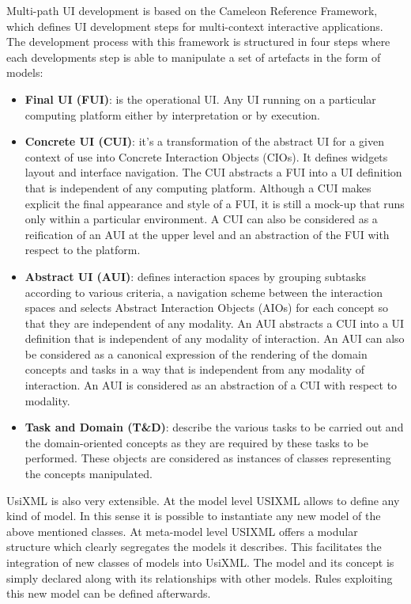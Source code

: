Multi-path UI development is based on the Cameleon Reference Framework\cite{Calvary}, which defines UI development steps for multi-context interactive applications. The development process with this framework is structured in four steps where each developments step is able to manipulate a set of artefacts in the form of models:
\begin{itemize}
\item \textbf{Final UI (FUI)}: is the operational UI. Any UI running on a particular computing platform either by interpretation or by execution.

\item \textbf{Concrete UI (CUI)}: it's a transformation of the abstract UI for a given context of use into Concrete Interaction Objects (CIOs). It defines widgets layout and interface navigation. The CUI abstracts a FUI into a UI definition that is independent of any computing platform. Although a CUI makes explicit the final appearance and style of a FUI, it is still a mock-up that runs only within a particular environment. A CUI can also be considered as a reification of an AUI at the upper level and an abstraction of the FUI with respect to the platform.

\item \textbf{Abstract UI (AUI)}: defines interaction spaces by grouping subtasks according to various criteria, a navigation scheme between the interaction spaces and selects Abstract Interaction Objects (AIOs) for each concept so that they are independent of any modality. An AUI abstracts a CUI into a UI definition that is independent of any modality of interaction. An AUI can also be considered as a canonical expression of the rendering of the domain concepts and tasks in a way that is independent from any modality of interaction. An AUI is considered as an abstraction of a CUI with respect to modality.

\item \textbf{Task and Domain (T\&D)}: describe the various tasks to be carried out and the domain-oriented concepts as they are required by these tasks to be performed. These objects are considered as instances of classes representing the concepts manipulated.
\end{itemize}

UsiXML is also very extensible. At the model level USIXML allows to define any kind of model. In this sense it is possible to instantiate any new model of the above mentioned classes. At meta-model level USIXML offers a modular structure which clearly segregates the models it describes. This facilitates the integration of new classes of models into UsiXML. The model and its concept is simply declared along with its relationships with other models. Rules exploiting this new model can be defined afterwards.


